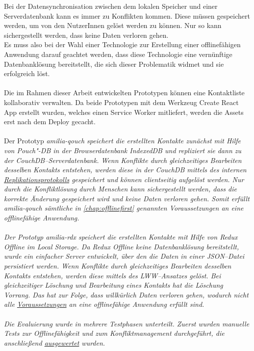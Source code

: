 Bei der Datensynchronisation zwischen dem lokalen Speicher und einer Serverdatenbank kann es immer zu Konflikten kommen.
Diese müssen gespeichert werden, um von den NutzerInnen gelöst werden zu können. Nur so kann sichergestellt werden, dass keine Daten verloren gehen.\\
Es muss also bei der Wahl einer Technologie zur Erstellung einer offlinefähigen Anwendung darauf geachtet werden, dass diese Technologie eine vernünftige Datenbanklösung bereitstellt, die sich dieser Problematik widmet und sie erfolgreich löst.\\\\
%
%
%
Die im Rahmen dieser Arbeit entwickelten Prototypen können eine Kontaktliste kollaborativ verwalten.
Da beide Prototypen mit dem Werkzeug Create React App erstellt wurden, welches einen Service Worker mitliefert, werden die \gls{Assets} erst nach dem Deploy gecacht.\\\\
Der Prototyp \it{amilia-qouch} speichert die erstellten Kontakte zunächst mit Hilfe von Pouch"-DB in der Browserdatenbank IndexedDB und repliziert sie dann zu der CouchDB--Serverdatenbank.
Wenn Konflikte durch gleichzeitiges Bearbeiten desselben Kontakts entstehen, werden diese in der CouchDB mittels des internen \hyperref[chap:replication]{Replikationsprotokolls} gespeichert und können clientseitig aufgelöst werden.
Nur durch die Konfliktlösung durch Menschen kann sichergestellt werden, dass die korrekte Änderung gespeichert wird und keine Daten verloren gehen.
Somit erfüllt \it{amilia-qouch} sämtliche in \autoref{chap:offlinefirst} genannten Voraussetzungen an eine offlinefähige Anwendung.\\\\
%
Der Prototyp \it{amilia-rdx} speichert die erstellten Kontakte mit Hilfe von Redux Offline im Local Storage.
Da Redux Offline keine Datenbanklösung bereitstellt, wurde ein einfacher Server entwickelt, über den die Daten in einer \gls{JSON}--Datei persistiert werden.
Wenn Konflikte durch gleichzeitiges Bearbeiten desselben Kontakts entstehen, werden diese mittels des \gls{LWW}--Ansatzes gelöst.
Bei gleichzeitiger Löschung und Bearbeitung eines Kontakts hat die Löschung Vorrang.
Das hat zur Folge, dass willkürlich Daten verloren gehen, wodurch nicht alle \hyperref[chap:offlinefirst]{Voraussetzungen} an eine offlinefähige Anwendung erfüllt sind.\\\\
%
%
Die Evaluierung wurde in mehrere Testphasen unterteilt. Zuerst wurden manuelle Tests zur Offlinefähigkeit und zum Konfliktmanagement durchgeführt, die anschließend \hyperref[chap:testauswertung]{ausgewertet} wurden.
